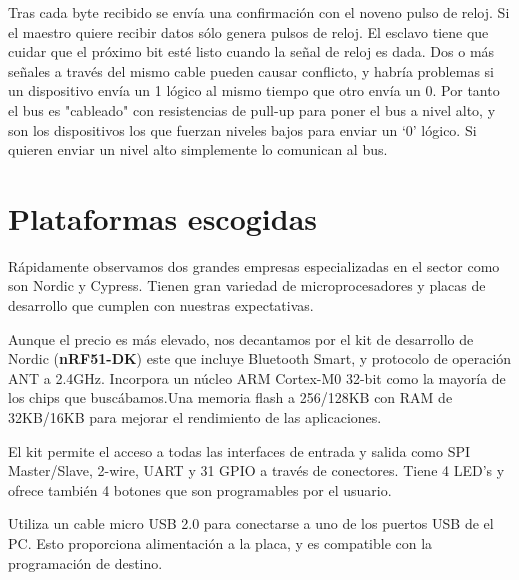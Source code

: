 Tras cada byte recibido se envía una confirmación con el noveno pulso de reloj. Si el maestro quiere recibir datos sólo genera pulsos de reloj. El esclavo tiene que cuidar que el próximo bit esté listo cuando la señal de reloj es dada. Dos o más señales a través del mismo cable pueden causar conflicto, y habría problemas si un dispositivo envía un 1 lógico al mismo tiempo que otro envía un 0. Por tanto el bus es "cableado" con resistencias de pull-up para poner el bus a nivel alto, y son los dispositivos los que fuerzan niveles bajos para enviar un ‘0’ lógico. Si quieren enviar un nivel alto simplemente lo comunican al bus.

\section{Plataformas escogidas}
\label{makereference3.4}

Rápidamente observamos dos grandes empresas especializadas en el sector como son Nordic y Cypress. Tienen gran variedad de microprocesadores y placas de desarrollo que cumplen con nuestras expectativas.

Aunque el precio es más elevado, nos decantamos por el kit de desarrollo de Nordic (\textbf{nRF51-DK}) este que incluye Bluetooth Smart, y protocolo de operación  ANT a 2.4GHz. Incorpora un núcleo ARM Cortex-M0 32-bit  como la mayoría de los chips que buscábamos.Una memoria flash a 256/128KB con RAM de 32KB/16KB para mejorar el rendimiento de las aplicaciones.

El kit permite el acceso a todas las interfaces de entrada y salida como SPI Master/Slave, 2-wire, UART y 31 GPIO a través de conectores. Tiene 4 LED’s y ofrece también 4 botones que son programables por el usuario. 

Utiliza un cable micro USB 2.0 para conectarse a uno de los puertos USB de el PC. Esto proporciona alimentación a la placa, y es compatible con la programación de destino.


